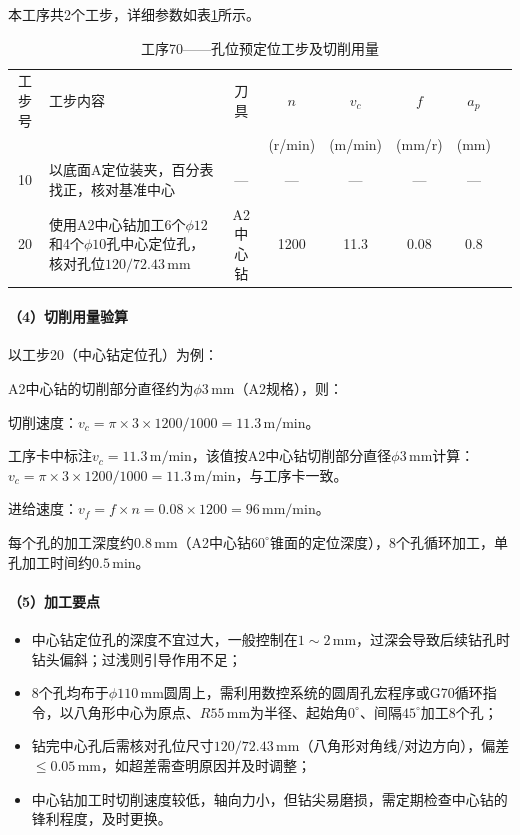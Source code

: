 \documentclass{xautCADreport}
\begin{document}
本工序共2个工步，详细参数如表\ref{tab:op70_die}所示。

\begin{table}[H]
  \centering
  \caption{工序70——孔位预定位工步及切削用量}
  \label{tab:op70_die}
  \small
  \setlength{\tabcolsep}{5pt}
  \begin{tabular}{cp{4.5cm}cccccc}
    \toprule
    工步号 & 工步内容 & 刀具 & \multicolumn{1}{c}{$n$} & \multicolumn{1}{c}{$v_c$} & \multicolumn{1}{c}{$f$} & \multicolumn{1}{c}{$a_p$} \\
    & & & (r/min) & (m/min) & (mm/r) & (mm) \\
    \midrule
    10 & 以底面A定位装夹，百分表找正，核对基准中心 & — & — & — & — & — \\
    20 & 使用A2中心钻加工6个$\phi12$和4个$\phi10$孔中心定位孔，核对孔位$120/72.43\,\mathrm{mm}$ & A2中心钻 & 1200 & 11.3 & 0.08 & 0.8 \\
    \bottomrule
  \end{tabular}
\end{table}

\paragraph{（4）切削用量验算}

以工步20（中心钻定位孔）为例：

A2中心钻的切削部分直径约为$\phi3\,\mathrm{mm}$（A2规格），则：

切削速度：$v_c = \pi \times 3 \times 1200 / 1000 = 11.3\,\mathrm{m/min}$。

工序卡中标注$v_c=11.3\,\mathrm{m/min}$，该值按A2中心钻切削部分直径$\phi3\,\mathrm{mm}$计算：$v_c = \pi \times 3 \times 1200 / 1000 = 11.3\,\mathrm{m/min}$，与工序卡一致。

进给速度：$v_f = f \times n = 0.08 \times 1200 = 96\,\mathrm{mm/min}$。

每个孔的加工深度约$0.8\,\mathrm{mm}$（A2中心钻$60^{\circ}$锥面的定位深度），8个孔循环加工，单孔加工时间约$0.5\,\mathrm{min}$。

\paragraph{（5）加工要点}

\begin{itemize}
  \item 中心钻定位孔的深度不宜过大，一般控制在$1\sim2\,\mathrm{mm}$，过深会导致后续钻孔时钻头偏斜；过浅则引导作用不足；
  \item 8个孔均布于$\phi110\,\mathrm{mm}$圆周上，需利用数控系统的圆周孔宏程序或G70循环指令，以八角形中心为原点、$R55\,\mathrm{mm}$为半径、起始角$0^{\circ}$、间隔$45^{\circ}$加工8个孔；
  \item 钻完中心孔后需核对孔位尺寸$120/72.43\,\mathrm{mm}$（八角形对角线/对边方向），偏差$\leq0.05\,\mathrm{mm}$，如超差需查明原因并及时调整；
  \item 中心钻加工时切削速度较低，轴向力小，但钻尖易磨损，需定期检查中心钻的锋利程度，及时更换。
\end{itemize}
\end{document}
